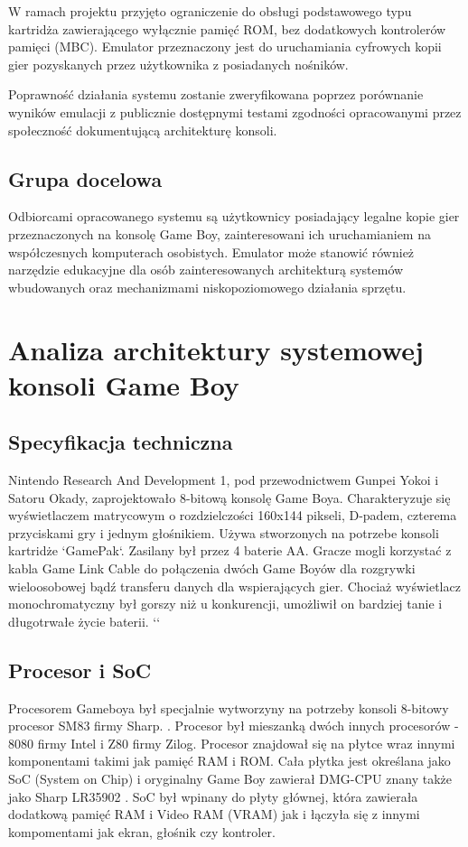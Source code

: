 \documentclass{article}
\begin{document}
W ramach projektu przyjęto ograniczenie do obsługi podstawowego typu kartridża zawierającego wyłącznie pamięć ROM, bez dodatkowych kontrolerów pamięci (MBC). Emulator przeznaczony jest do uruchamiania cyfrowych kopii gier pozyskanych przez użytkownika z posiadanych nośników.

Poprawność działania systemu zostanie zweryfikowana poprzez porównanie wyników emulacji z publicznie dostępnymi testami zgodności opracowanymi przez społeczność dokumentującą architekturę konsoli.

\subsection{Grupa docelowa}

Odbiorcami opracowanego systemu są użytkownicy posiadający legalne kopie gier przeznaczonych na konsolę Game Boy, zainteresowani ich uruchamianiem na współczesnych komputerach osobistych. Emulator może stanowić również narzędzie edukacyjne dla osób zainteresowanych architekturą systemów wbudowanych oraz mechanizmami niskopoziomowego działania sprzętu.
\section{Analiza architektury systemowej konsoli Game Boy}
\subsection{Specyfikacja techniczna}
Nintendo Research And Development 1, pod przewodnictwem Gunpei Yokoi i Satoru Okady, zaprojektowało 8-bitową konsolę Game Boya. Charakteryzuje się wyświetlaczem matrycowym o rozdzielczości 160x144 pikseli, D-padem, czterema przyciskami gry i jednym głośnikiem. Używa stworzonych na potrzebe konsoli kartridże `GamePak`. Zasilany był przez 4 baterie AA. Gracze mogli korzystać z kabla Game Link Cable do połączenia dwóch Game Boyów dla rozgrywki wieloosobowej bądź transferu danych dla wspierających gier. Chociaż wyświetlacz monochromatyczny był gorszy niż u konkurencji, umożliwił on bardziej tanie i długotrwałe życie baterii. `\cite{wikipedia-gameboy}`
\subsection{Procesor i SoC}
Procesorem Gameboya był specjalnie wytworzyny na potrzeby konsoli  8-bitowy procesor SM83 firmy Sharp. \cite{gbctr}. Procesor był mieszanką dwóch innych procesorów - 8080 firmy Intel i Z80 firmy Zilog. Procesor znajdował się na płytce wraz innymi komponentami takimi jak pamięć RAM i ROM. Cała płytka jest określana jako SoC (System on Chip) i oryginalny Game Boy zawierał DMG-CPU znany także jako Sharp LR35902 \cite{copetti}. SoC był wpinany do płyty głównej, która zawierała dodatkową pamięć RAM i Video RAM (VRAM) jak i łączyła się z innymi kompomentami jak ekran, głośnik czy kontroler. 
\end{document}
